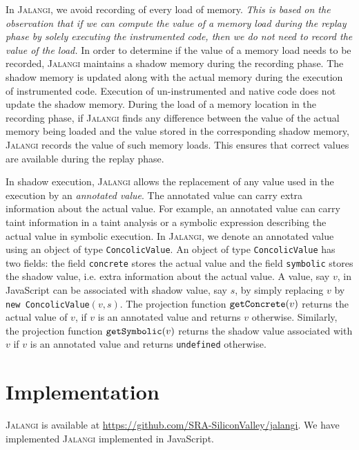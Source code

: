 \documentclass{sig-alternate}
\def\jalangi{\textsc{Jalangi}}
\newcommand \Actual{{\tt getConcrete}}
\newcommand \Shadow{{\tt getSymbolic}}
\begin{document}
In \jalangi{}, we avoid recording of every load of memory.  \emph{This
  is based on the observation that if we can compute the value of a
  memory load during the replay phase by solely executing the
  instrumented code, then we do not need to record the value of the
  load.}  In order to determine if the value of a memory load needs to
be recorded, \jalangi{} maintains a shadow memory during the recording
phase.  The shadow memory is updated along with the actual memory
during the execution of instrumented code.  Execution of
un-instrumented and native code does not update the shadow memory.
During the load of a memory location in the recording phase, if
\jalangi{} finds any difference between the value of the actual memory
being loaded and the value stored in the corresponding shadow memory,
\jalangi{} records the value of such memory loads. This ensures that
correct values are available during the replay phase.

In shadow execution, \jalangi{} allows the replacement of any value
used in the execution by an \emph{annotated value}.  The annotated
value can carry extra information about the actual value.  For
example, an annotated value can carry taint information in a taint
analysis or a symbolic expression describing the actual value in
symbolic execution.  In \jalangi{}, we denote an annotated value using
an object of type \texttt{ConcolicValue}.  An object of type
\texttt{ConcolicValue} has two fields: the field \texttt{concrete}
stores the actual value and the field \texttt{symbolic} stores the
shadow value, i.e. extra information about the actual value.  A value,
say $v$, in JavaScript can be associated with shadow value, say $s$,
by simply replacing $v$ by \texttt{new ConcolicValue}$(v, s)$.  The
projection function $\Actual(v)$ returns the actual value of $v$, if
$v$ is an annotated value and returns $v$ otherwise.  Similarly, the
projection function $\Shadow(v)$ returns the shadow value associated
with $v$ if $v$ is an annotated value and returns \texttt{undefined}
otherwise.


\section{Implementation}
\label{sec:implementation}

\jalangi{} is available at
\url{https://github.com/SRA-SiliconValley/jalangi}.  We have
implemented \jalangi{} implemented in JavaScript.
\end{document}
